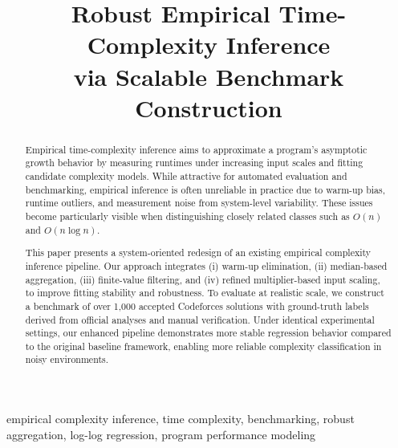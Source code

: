 \documentclass[conference]{IEEEtran}
\begin{document}
\title{
Robust Empirical Time-Complexity Inference \\
via Scalable Benchmark Construction
}

\author{
}

\maketitle

\begin{abstract}
Empirical time-complexity inference aims to approximate a program's asymptotic
growth behavior by measuring runtimes under increasing input scales and fitting
candidate complexity models.
While attractive for automated evaluation and benchmarking, empirical inference
is often unreliable in practice due to warm-up bias, runtime outliers, and
measurement noise from system-level variability.
These issues become particularly visible when distinguishing closely related
classes such as $O(n)$ and $O(n \log n)$.

This paper presents a system-oriented redesign of an existing empirical
complexity inference pipeline.
Our approach integrates (i) warm-up elimination, (ii) median-based aggregation,
(iii) finite-value filtering, and (iv) refined multiplier-based input scaling,
to improve fitting stability and robustness.
To evaluate at realistic scale, we construct a benchmark of over 1,000 accepted
Codeforces solutions with ground-truth labels derived from official analyses and
manual verification.
Under identical experimental settings, our enhanced pipeline demonstrates more
stable regression behavior compared to the original baseline framework, enabling
more reliable complexity classification in noisy environments.

\end{abstract}

\begin{IEEEkeywords}
empirical complexity inference,
time complexity,
benchmarking,
robust aggregation,
log-log regression,
program performance modeling
\end{IEEEkeywords}
\end{document}
